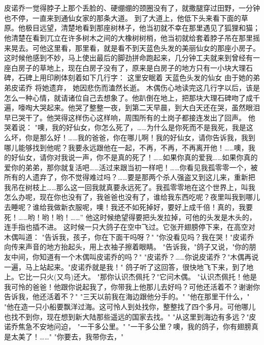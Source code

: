 \documentclass[12pt,UTF8]{ctexbook}
\begin{document}
\chapter{}

皮诺乔一觉得脖子上那个丢脸的、硬绷绷的颈圈没有了，就撒腿穿过田野，一分钟也不停，一直来到通仙女家的那条大道。
到了大道上，他低下头来看下面的草原。他极目远望，清楚地看到那座树林子，他当初就不幸在那里遇见了狐狸和猫；他清楚在看到兀立在许多树木之间的大橡树树梢，他当初就给套着脖子吊在那里摇来晃去。可他这里看，那里看，就是看不到天蓝色头发的美丽仙女的那座小房子。
这时候他感到不妙，马上使出最后的脚劲拼命跑起来，几分钟工夫就来到曾经有一座白房子的草地上，现在白房子没有了，原来是白房子的地方只有一小块大理石碑，石碑上用印刷体刻着如下几行字：
这里安眠着
天蓝色头发的仙女
由于她的弟弟皮诺乔
将她遗弃，
她因悲伤而溘然长逝。
木偶伤心地读完这几行字以后，该是怎么一种心情，就请诸位自己去想象了。他趴倒在地上，把那块大理石碑吻了成千遍，嚎啕大哭起来。他哭了整整一夜，到第二天早晨，到大白天还在哭，虽然眼泪早已哭干了。他哭得这样伤心这样响，周围所有的土岗子都接连发出了回声。
他哭着说：
"噢，我的好仙女，你怎么死了，……为什么是你死而不是我死，我是这么坏，你是那么好！……我的爸爸，你在哪儿啊！我的好仙女，请你告诉我，我到哪儿能够找到他呢？我要永远跟他在一起，不再，不再，不再离开他！……噢，我的好仙女，请你对我说一声，你不是真的死了！……如果你真的爱我……如果你真的爱你的弟弟，那你就复活吧……活过来跟当初一样吧！……你看见我孤零零一个，被所有的人遗弃了，你不觉得难过吗？……要是那两个杀人强盗又到这儿来，重新把我吊在树枝上……那么这一回我就真要永远死了。我孤零零地在这个世界上，叫我怎么办呢，现在你也没有了，我爸爸也没有了，谁给我东西吃呢？夜里叫我到哪儿去睡呢？谁给我做新衣服呢，噢！我还不如死掉好，要好上成千倍！真的，我要死！……哟！哟！哟！……”
他这时候绝望得要把头发拉掉，可他的头发是木头的，连手指也插不进。
这时候一只大鸽子在空中飞过。它张开翅膀停下来，在高空对木偶叫道：
"告诉我，孩子，你在下面干吗呀？"
"你没看见吗？我在哭！"皮诺乔向传来声音的地方抬起头，用上衣袖子擦着眼睛。
"告诉我，"鸽子又说，"你的朋友中间，你知道有一个木偶叫皮诺乔的吗？"
"皮诺乔？……你说皮诺乔？"木偶再说一遍，马上站起来。"皮诺乔就是我！"
鸽子听了这回答，很快地飞下来，到了地上。它比一只火(又鸟)还大。
"那你认识杰佩托？"它问木偶。
"认识杰佩托！他是我可怜的爸爸！他跟你说起我了，你带我上他那儿去好吗？可他还活着不？谢谢你告诉我，他还活着不？"
"三天以前我在海边跟他分手的。"
"他在那里干什么，"
"他在造一只小船要飘洋过海。这可怜人到处找你，整整找了四个多月。可他哪儿也找不到你，现在想到新大陆那些遥远的国家去找。"
"从这里到海边有多远？"皮诺乔焦急不安地问迫，
"一干多公里。"
"一干多公里？噢，我的鸽子，你有翅膀真是太美了！……"
"你要去，我带你去，"
\end{document}
